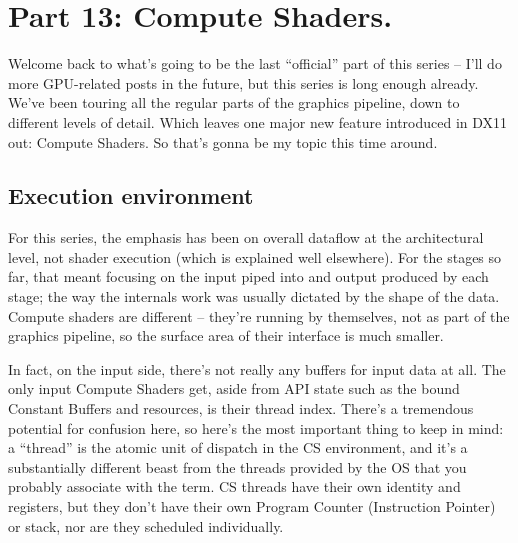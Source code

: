 \documentclass[12pt]{article}
\begin{document}
\section{Part 13: Compute Shaders.}
\label{sec:org3eee6ee}
\label{part13}

Welcome back to what’s going to be the last “official” part of this series – I’ll do more GPU-related posts in the future, but this series is long enough already. We’ve been touring all the regular parts of the graphics pipeline, down to different levels of detail. Which leaves one major new feature introduced in DX11 out: Compute Shaders. So that’s gonna be my topic this time around.

\subsection{Execution environment}
\label{sec:org095b63f}

For this series, the emphasis has been on overall dataflow at the architectural level, not shader execution (which is explained well elsewhere). For the stages so far, that meant focusing on the input piped into and output produced by each stage; the way the internals work was usually dictated by the shape of the data. Compute shaders are different – they’re running by themselves, not as part of the graphics pipeline, so the surface area of their interface is much smaller.

In fact, on the input side, there’s not really any buffers for input data at all. The only input Compute Shaders get, aside from API state such as the bound Constant Buffers and resources, is their thread index. There’s a tremendous potential for confusion here, so here’s the most important thing to keep in mind: a “thread” is the atomic unit of dispatch in the CS environment, and it’s a substantially different beast from the threads provided by the OS that you probably associate with the term. CS threads have their own identity and registers, but they don’t have their own Program Counter (Instruction Pointer) or stack, nor are they scheduled individually.
\end{document}
